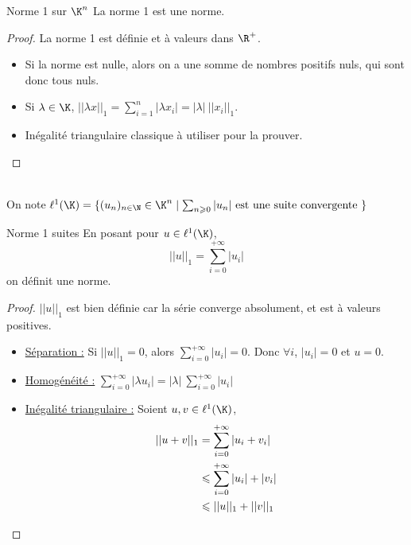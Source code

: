 \begin{theoreme}{Norme 1 sur $\K^n$}{}
    La norme 1 est une norme.
\end{theoreme}

\begin{proof}
    La norme 1 est définie et à valeurs dans $\R^+$. 

    \begin{itemize}
        \item Si la norme est nulle, alors on a une somme de nombres positifs nuls, qui sont donc tous nuls. 
        \item Si $\displaystyle \lambda \in \K$, $||\lambda x ||_1 = \sum_{i = 1 }^{n }|\lambda x_i | = |\lambda| ~ ||x_i||_1$.
        \item  Inégalité triangulaire classique à utiliser pour la prouver. 
    \end{itemize}
\end{proof}

\begin{definitionnt}{}{}
    \\On note $\ell^1(\K) = \{(u_n)_{n \in \N} \in \K^n \mid \sum_{n \geqslant 0} |u_n| ~ \text{est une suite convergente} ~ \}$
\end{definitionnt}

\begin{theoreme}{Norme 1 suites}{}
    En posant pour $u \in \ell^1(\K)$,
    $$||u||_1 = \sum_{i = 0}^{+ \infty }|u_i|$$ 
    on définit une norme. 
\end{theoreme}

\begin{proof}
    $|| u ||_1$ est bien définie car la série converge absolument, et est à valeurs positives.

    \begin{itemize}
        \item \uline{Séparation :}
        Si $||u ||_1 = 0$, alors $\displaystyle \sum_{i = 0}^{+ \infty}  |u_i| = 0 $.
        Donc $\forall i$, $|u_i| = 0 $ et $u = 0$. 

        \item \uline{Homogénéité :}
        $\displaystyle \sum_{ i = 0 }^{+ \infty } |\lambda u_i| = |\lambda| ~ \sum_{i = 0 }^{+ \infty } |u_i|$
        
        \item \uline{Inégalité triangulaire :} Soient $u, v \in \ell^1(\K)$,
        \[ \displaystyle
            \begin{aligned}
                ||u + v ||_1 & =  \sum_{i = 0 }^{+ \infty } |u_i + v_i| \\
                \space & \leqslant  \sum_{i = 0}^{+ \infty} |u_i| + |v_i| \\
                \space & \leqslant  ||u||_1 + ||v||_1 \\
            \end{aligned}
        \]
    \end{itemize}
\end{proof}

